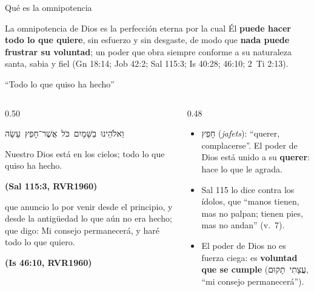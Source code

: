 \documentclass[hyperref={bookmarks=false},aspectratio=169]{beamer}
\newcommand{\heb}[1]{\mbox{\foreignlanguage{hebrew}{#1}}}
\newcommand{\fuente}[1]{\par\hfill{\upshape\bfseries\footnotesize\textcolor{azul}{#1}}}
\newcommand{\destacar}[1]{\textbf{\textcolor{azul}{#1}}}
\begin{document}
\begin{frame}{Qué es la omnipotencia}
\begin{tcolorbox}[colback=papiro,colframe=azul,boxrule=1pt,arc=3pt]
\small La omnipotencia de Dios es la perfección eterna por la cual Él \destacar{puede hacer todo lo que quiere}, sin esfuerzo y sin desgaste, de modo que \destacar{nada puede frustrar su voluntad}; un poder que obra siempre conforme a su naturaleza santa, sabia y fiel (Gn 18:14; Job 42:2; Sal 115:3; Is 40:28; 46:10; 2~Ti 2:13).
\end{tcolorbox}
\centering
{}
\end{frame}

\begin{frame}{``Todo lo que quiso ha hecho''}
\begin{columns}[t,onlytextwidth]
\begin{column}{0.50\textwidth}
\begin{center}\small\heb{וֵאלֹהֵינוּ בַשָּׁמָיִם כֹּל אֲשֶׁר־חָפֵץ עָשָׂה}\end{center}
\begin{cita}Nuestro Dios está en los cielos; todo lo que quiso ha hecho.\fuente{(Sal 115:3, RVR1960)}\end{cita}
\begin{cita}[fontupper=\scriptsize\itshape]que anuncio lo por venir desde el principio, y desde la antigüedad lo que aún no era hecho; que digo: Mi consejo permanecerá, y haré todo lo que quiero.\fuente{(Is 46:10, RVR1960)}\end{cita}
\end{column}
\begin{column}{0.48\textwidth}\small
\begin{itemize}
\item \heb{חָפֵץ} (\emph{jafets}): ``querer, complacerse''. El poder de Dios está unido a su \destacar{querer}: hace lo que le agrada.
\item Sal 115 lo dice contra los ídolos, que ``manos tienen, mas no palpan; tienen pies, mas no andan'' (v.~7).
\item El poder de Dios no es fuerza ciega: es \destacar{voluntad que se cumple} (\heb{עֲצָתִי תָקוּם}, ``mi consejo permanecerá'').
\end{itemize}
\end{column}
\end{columns}
\end{frame}
\end{document}
